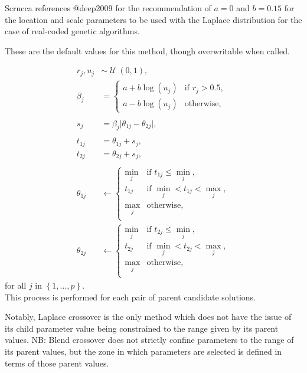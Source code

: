 \documentclass[
  a4paper,
  DIV=11,
  numbers=noendperiod]{scrartcl}
\newcommand{\+}{\phantom{-}}
\newcommand{\op}[2]{\operatorname{#1}\left(#2\right)}
\begin{document}
\begin{tcolorbox}[title=Laplace crossover: \texttt{gareal\_laplaceCrossover()}]
Scrucca references @deep2009 for the recommendation of $a=0$ and $b=0.15$ for the location and scale parameters to be used with the Laplace distribution for the case of real-coded genetic algorithms.

These are the default values for this method, though overwritable when called.

$$
\begin{aligned}
r_j,u_j &\sim \op{\mathcal U}{0,1},\\
\beta_j &= \begin{cases}
a+b\log\left(u_j\right) & \text{if } r_j > 0.5, \\
a-b\log\left(u_j\right) & \text{otherwise},
\end{cases}\\
\\
s_j &= \beta_j \lvert \theta_{1j} - \theta_{2j} \rvert, \\
\\
t_{1j} &= \theta_{1j} + s_j,\\
t_{2j} &= \theta_{2j} + s_j, \\
\\
\theta_{1j} &\leftarrow 
\begin{cases}
\min_j & \text{if } t_{1j} \leq \min_j,\\
t_{1j} & \text{if } \min_j < t_{1j} < \max_j,\\
\max_j & \text{otherwise},\\
\end{cases}\\
\theta_{2j} &\leftarrow
\begin{cases}
\min_j & \text{if } t_{2j} \leq \min_j,\\
t_{2j} & \text{if } \min_j < t_{2j} < \max_j,\\
\max_j & \text{otherwise},\\
\end{cases}
\end{aligned}
$$
for all $j$ in $\left\{1, \dots, p\right\}$.\\

This process is performed for each pair of parent candidate solutions.
\end{tcolorbox}

Notably, Laplace crossover is the only method which does not have the
issue of its child parameter value being constrained to the range given
by its parent values. NB: Blend crossover does not strictly confine
parameters to the range of its parent values, but the zone in which
parameters are selected is defined in terms of those parent values.
\end{document}
